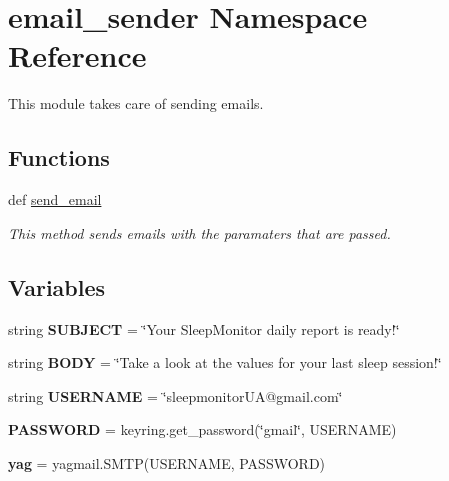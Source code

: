 \hypertarget{namespaceemail__sender}{}\section{email\+\_\+sender Namespace Reference}
\label{namespaceemail__sender}


This module takes care of sending emails.  


\subsection*{Functions}
\begin{DoxyCompactItemize}
\item 
def \hyperlink{namespaceemail__sender_a96c0c162386a3200522f5fcceae4a193}{send\+\_\+email}
\begin{DoxyCompactList}\small\item\em This method sends emails with the paramaters that are passed. \end{DoxyCompactList}\end{DoxyCompactItemize}
\subsection*{Variables}
\begin{DoxyCompactItemize}
\item 
\mbox{\label{namespaceemail__sender_a3ef5b96b516cf94aa76d380fc146c8d9}} 
string {\bfseries S\+U\+B\+J\+E\+CT} = \char`\"{}Your Sleep\+Monitor daily report is ready!\char`\"{}
\item 
\mbox{\label{namespaceemail__sender_a7f4ab8cd89c0c818a06a2c46f9a499bd}} 
string {\bfseries B\+O\+DY} = \char`\"{}Take a look at the values for your last sleep session!\char`\"{}
\item 
\mbox{\label{namespaceemail__sender_a3e710890e85c3b4f7d7a62ef2143b1a0}} 
string {\bfseries U\+S\+E\+R\+N\+A\+ME} = \char`\"{}sleepmonitor\+UA@gmail.\+com\char`\"{}
\item 
\mbox{\label{namespaceemail__sender_a67cfc42f1e1020a8629b7e465d301589}} 
{\bfseries P\+A\+S\+S\+W\+O\+RD} = keyring.\+get\+\_\+password(\char`\"{}gmail\char`\"{}, U\+S\+E\+R\+N\+A\+ME)
\item 
\mbox{\label{namespaceemail__sender_a90a63e9aa77ce7ca7695ce2e8b354efe}} 
{\bfseries yag} = yagmail.\+S\+M\+TP(U\+S\+E\+R\+N\+A\+ME, P\+A\+S\+S\+W\+O\+RD)
\end{DoxyCompactItemize}


